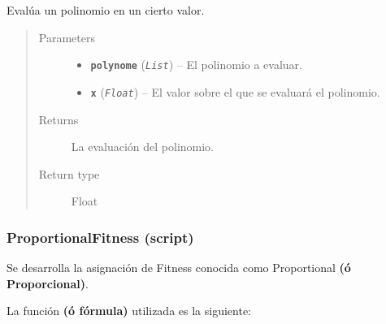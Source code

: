 \documentclass[letterpaper,10pt,english]{sphinxmanual}
\begin{document}
\begin{fulllineitems}
\label{Model/Fitness/NonLinearRankingFitness:Model.Fitness.NonLinearRankingFitness.evaluate_polynome}
Evalúa un polinomio en un cierto valor.
\begin{quote}\begin{description}
\item[{Parameters}] \leavevmode\begin{itemize}
\item {} 
\textbf{\texttt{polynome}} (\emph{\texttt{List}}) -- El polinomio a evaluar.

\item {} 
\textbf{\texttt{x}} (\emph{\texttt{Float}}) -- El valor sobre el que se evaluará el polinomio.

\end{itemize}

\item[{Returns}] \leavevmode
La evaluación del polinomio.

\item[{Return type}] \leavevmode
Float

\end{description}\end{quote}

\end{fulllineitems}



\subsubsection{ProportionalFitness (script)}
\label{Model/Fitness/ProportionalFitness:proportionalfitness-script}\label{Model/Fitness/ProportionalFitness::doc}
\begin{DUlineblock}{0em}
\item[] Se desarrolla la asignación de Fitness conocida como Proportional \textbf{(ó Proporcional)}.
\item[] La función \textbf{(ó fórmula)} utilizada es la siguiente:
\end{DUlineblock}
\end{document}
